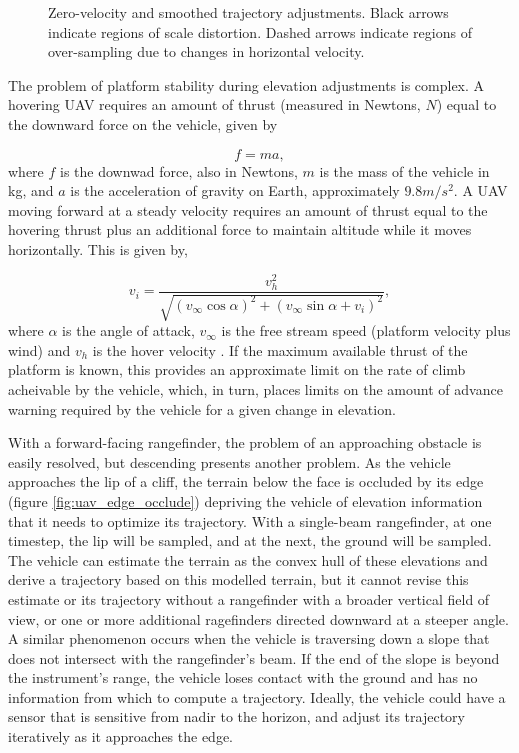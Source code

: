 \documentclass[10pt]{report}
\begin{document}
\begin{figure}
\centering
\def\svgscale{0.5}

\caption{Zero-velocity and smoothed trajectory adjustments. Black arrows indicate regions of scale distortion. Dashed arrows indicate regions of over-sampling due to changes in horizontal velocity.}
\label{fig:uav_smooth_traj}
\end{figure}

The problem of platform stability during elevation adjustments is complex. A hovering UAV requires an amount of thrust (measured in Newtons, $N$) equal to the downward force on the vehicle, given by

\begin{equation}
f = ma,
\label{eq:hover_force}
\end{equation} where $f$ is the downwad force, also in Newtons, $m$ is the mass of the vehicle in kg, and $a$ is the acceleration of gravity on Earth, approximately $9.8m/s^2$. A UAV moving forward at a steady velocity requires an amount of thrust equal to the hovering thrust plus an additional force to maintain altitude while it moves horizontally. This is given by,

\begin{equation}
v_i = \dfrac{ v_h^2 } { \sqrt{ (v_\infty \cos \alpha)^2 + (v_\infty \sin \alpha + v_i)^2 } } ,
\label{eq:move_force}
\end{equation} where $\alpha$ is the angle of attack, $v_\infty$ is the free stream speed (platform velocity plus wind) and $v_h$ is the hover velocity \cite{Hoffmann2007}. If the maximum available thrust of the platform is known, this provides an approximate limit on the rate of climb acheivable by the vehicle, which, in turn, places limits on the amount of advance warning required by the vehicle for a given change in elevation.

With a forward-facing rangefinder, the problem of an approaching obstacle is easily resolved, but descending presents another problem. As the vehicle approaches the lip of a cliff, the terrain below the face is occluded by its edge (figure \ref{fig:uav_edge_occlude}) depriving the vehicle of elevation information that it needs to optimize its trajectory. With a single-beam rangefinder, at one timestep, the lip will be sampled, and at the next, the ground will be sampled. The vehicle can estimate the terrain as the convex hull of these elevations and derive a trajectory based on this modelled terrain, but it cannot revise this estimate or its trajectory without a rangefinder with a broader vertical field of view, or one or more additional ragefinders directed downward at a steeper angle. A similar phenomenon occurs when the vehicle is traversing down a slope that does not intersect with the rangefinder's beam. If the end of the slope is beyond the instrument's range, the vehicle loses contact with the ground and has no information from which to compute a trajectory.  Ideally, the vehicle could have a sensor that is sensitive from nadir to the horizon, and adjust its trajectory iteratively as it approaches the edge. 
\end{document}
